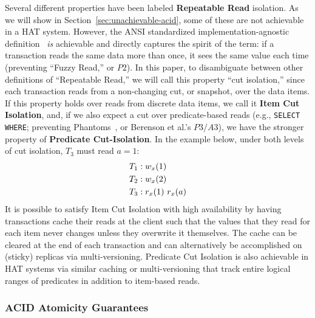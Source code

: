 Several different properties have been labeled \textbf{Repeatable
  Read} isolation. As we will show in
Section~\ref{sec:unachievable-acid}, some of these are not achievable
in a HAT system. However, the ANSI standardized
implementation-agnostic definition~\cite{ansi-sql} \textit{is}
achievable and directly captures the spirit of the term: if a
transaction reads the same data more than once, it sees the same value each
time (preventing ``Fuzzy Read,'' or $P2$). In this paper, to
disambiguate between other definitions of ``Repeatable Read,'' we will
call this property ``cut isolation,'' since each transaction reads
from a non-changing cut, or snapshot, over the data items. If this
property holds over reads from discrete data items, we call it
\textbf{Item Cut Isolation}, and, if we also expect a cut over
predicate-based reads (e.g., \texttt{SELECT WHERE}; preventing
Phantoms~\cite{gray-isolation}, or Berenson et al.'s $P3/A3$), we have
the stronger property of \textbf{Predicate Cut-Isolation}. In the
example below, under both levels of cut isolation, $T_3$ must read
$a=1$:
\begin{align*}
\small
T_1 &: w_x(1)
\\T_2 &: w_x(2)
\\T_3 &: r_x(1)~r_x(a)
\end{align*}
It is possible to satisfy Item Cut Isolation with high availability by
having transactions cache their reads at the client such that the
values that they read for each item never changes unless they
overwrite it themselves. The cache can be cleared at the end of each
transaction and can alternatively be accomplished on (sticky) replicas
via multi-versioning. Predicate Cut Isolation is also achievable in
HAT systems via similar caching or multi-versioning that track entire
logical ranges of predicates in addition to item-based reads.

\subsubsection{ACID Atomicity Guarantees}
\label{sec:ta}

